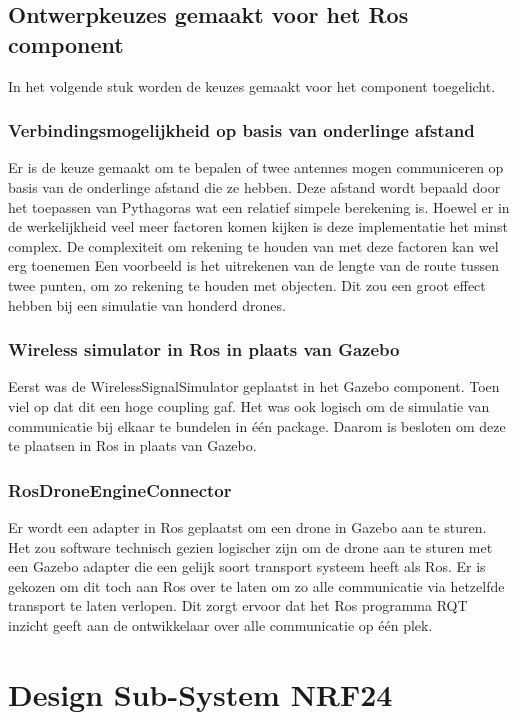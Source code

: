 \documentclass[a4paper, 11pt, oneside]{report}
\begin{document}
\subsection{Ontwerpkeuzes gemaakt voor het Ros component}
\label{DetailedDesign:ros:ontwerkeuzes}
In het volgende stuk worden de keuzes gemaakt voor het component toegelicht.

\subsubsection{Verbindingsmogelijkheid op basis van onderlinge afstand}
Er is de keuze gemaakt om te bepalen of twee antennes mogen communiceren op basis van de onderlinge afstand die ze hebben.
Deze afstand wordt bepaald door het toepassen van Pythagoras wat een relatief simpele berekening is. 
Hoewel er in de werkelijkheid veel meer factoren komen kijken is deze implementatie het minst complex.
De complexiteit om rekening te houden van met deze factoren kan wel erg toenemen
Een voorbeeld is het uitrekenen van de lengte van de route tussen twee punten, om zo rekening te houden met objecten.
Dit zou een groot effect hebben bij een simulatie van honderd drones.

\subsubsection{Wireless simulator in Ros in plaats van Gazebo}
Eerst was de WirelessSignalSimulator geplaatst in het Gazebo component. 
Toen viel op dat dit een hoge coupling gaf.
Het was ook logisch om de simulatie van communicatie bij elkaar te bundelen in één package.
Daarom is besloten om deze te plaatsen in Ros in plaats van Gazebo.

\subsubsection{RosDroneEngineConnector}
Er wordt een adapter in Ros geplaatst om een drone in Gazebo aan te sturen.
Het zou software technisch gezien logischer zijn om de drone aan te sturen met een Gazebo adapter die een gelijk soort transport systeem heeft als Ros.
Er is gekozen om dit toch aan Ros over te laten om zo alle communicatie via hetzelfde transport te laten verlopen.
Dit zorgt ervoor dat het Ros programma RQT inzicht geeft aan de ontwikkelaar over alle communicatie op één plek.


\section{Design Sub-System NRF24}
\label{DetailedDesign:NRF24}
\end{document}
